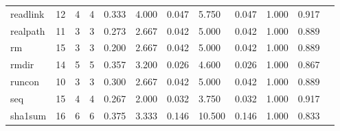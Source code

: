 \begin{longtable}{lp{1.00cm}p{1.00cm}p{1.00cm}p{1.00cm}p{1.00cm}p{1.00cm}p{1.00cm}p{1.00cm}p{1.00cm}p{1.00cm}p{1.00cm}}
readlink  &                           12 &                  4 &                                 4 &                                      0.333 &                                  4.000 &                                        0.047 &                             5.750 &                                   0.047 &                        1.000 &                                        0.917 \\
realpath  &                           11 &                  3 &                                 3 &                                      0.273 &                                  2.667 &                                        0.042 &                             5.000 &                                   0.042 &                        1.000 &                                        0.889 \\
rm        &                           15 &                  3 &                                 3 &                                      0.200 &                                  2.667 &                                        0.042 &                             5.000 &                                   0.042 &                        1.000 &                                        0.889 \\
rmdir     &                           14 &                  5 &                                 5 &                                      0.357 &                                  3.200 &                                        0.026 &                             4.600 &                                   0.026 &                        1.000 &                                        0.867 \\
runcon    &                           10 &                  3 &                                 3 &                                      0.300 &                                  2.667 &                                        0.042 &                             5.000 &                                   0.042 &                        1.000 &                                        0.889 \\
seq       &                           15 &                  4 &                                 4 &                                      0.267 &                                  2.000 &                                        0.032 &                             3.750 &                                   0.032 &                        1.000 &                                        0.917 \\
sha1sum   &                           16 &                  6 &                                 6 &                                      0.375 &                                  3.333 &                                        0.146 &                            10.500 &                                   0.146 &                        1.000 &                                        0.833 \\

\end{longtable}
